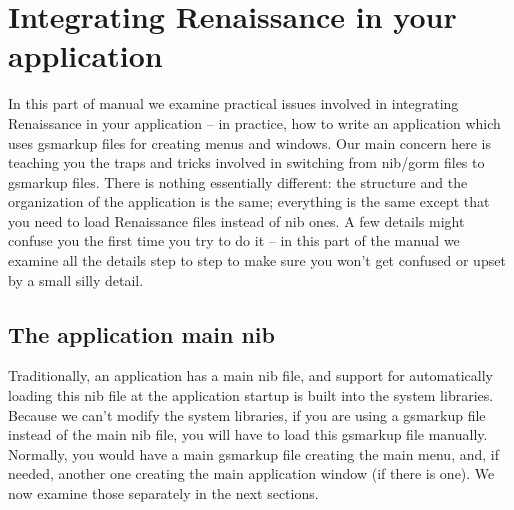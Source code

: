 \section{Integrating Renaissance in your application}
In this part of manual we examine practical issues involved in
integrating Renaissance in your application -- in practice, how to
write an application which uses gsmarkup files for creating menus and
windows.  Our main concern here is teaching you the traps and tricks
involved in switching from nib/gorm files to gsmarkup files.  There is
nothing essentially different: the structure and the organization of
the application is the same; everything is the same except that you
need to load Renaissance files instead of nib ones.  A few details
might confuse you the first time you try to do it -- in this part of
the manual we examine all the details step to step to make sure you
won't get confused or upset by a small silly detail.

\subsection{The application main nib}
Traditionally, an application has a main nib file, and support for
automatically loading this nib file at the application startup is
built into the system libraries.  Because we can't modify the system
libraries, if you are using a gsmarkup file instead of the main nib
file, you will have to load this gsmarkup file manually.  Normally,
you would have a main gsmarkup file creating the main menu, and, if
needed, another one creating the main application window (if there is
one).  We now examine those separately in the next sections.

